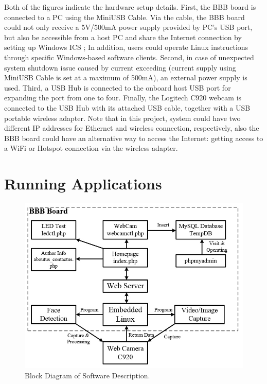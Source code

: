 \documentclass[13pt,journal,draftclsnofoot,onecolumn]{IEEEtran}
\begin{document}
Both of the figures indicate the hardware setup details. First, the BBB board is connected to a PC using the MiniUSB Cable. Via the cable, the BBB board could not only receive a 5V/500mA power supply provided by PC's USB port, but also be accessible from a host PC and share the Internet connection by setting up Windows ICS \cite{windowsICS}; In addition, users could operate Linux instructions through specific Windows-based software clients. Second, in case of unexpected system shutdown issue caused by current exceeding (current supply using MiniUSB Cable is set at a maximum of 500mA), an external power supply is used. Third, a USB Hub is connected to the onboard host USB port for expanding the port from one to four. Finally, the Logitech C920 webcam is connected to the USB Hub with its attached USB cable, together with a USB portable wireless adapter. Note that in this project, system could have two different IP addresses for Ethernet and wireless connection, respectively, also the BBB board could have an alternative way to access the Internet: getting access to a WiFi or Hotspot connection via the wireless adapter.


\section{Running Applications}\label{SfDes}
\begin{figure}[ht]
	\centering
	\includegraphics[width=5in]{./figs/sw1.jpg}
	\caption{Block Diagram of Software Description.}
	\label{sw1}
\end{figure}
\end{document}
